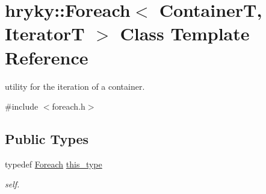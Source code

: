 \hypertarget{classhryky_1_1_foreach}{\section{hryky\-:\-:Foreach$<$ Container\-T, Iterator\-T $>$ Class Template Reference}
\label{classhryky_1_1_foreach}
}


utility for the iteration of a container.  




{\ttfamily \#include $<$foreach.\-h$>$}

\subsection*{Public Types}
\begin{DoxyCompactItemize}
\item 
\hypertarget{classhryky_1_1_foreach_a57418e3f3130d8e58f62b54d6c209798}{typedef \hyperlink{classhryky_1_1_foreach}{Foreach} \hyperlink{classhryky_1_1_foreach_a57418e3f3130d8e58f62b54d6c209798}{this\-\_\-type}}\label{classhryky_1_1_foreach_a57418e3f3130d8e58f62b54d6c209798}

\begin{DoxyCompactList}\small\item\em self. \end{DoxyCompactList}\end{DoxyCompactItemize}
